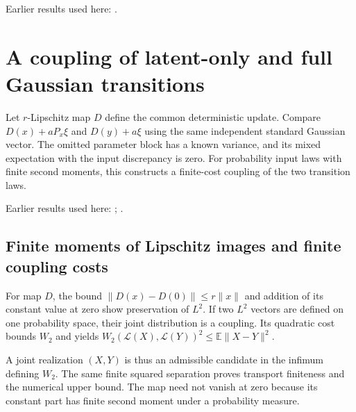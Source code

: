 \documentclass[11pt,a4paper]{report}
\begin{document}
Earlier results used here: \cite[Section~3.1.1]{LangevinLean2026IPLA}.
\section{\texorpdfstring{A coupling of latent-only and full Gaussian transitions}{A coupling of latent-only and full Gaussian transitions}}
\label{proof-module-ProximalLangevin-MYPGDTransport-lean}


Let \(r\)-Lipschitz map \(D\) define the common deterministic update. Compare \(D(x)+aP_x\xi\) and \(D(y)+a\xi\) using the same independent standard Gaussian vector. The omitted parameter block has a known variance, and its mixed expectation with the input discrepancy is zero. For probability input laws with finite second moments, this constructs a finite-cost coupling of the two transition laws.



Earlier results used here: \cite[Section~3.22]{LangevinLean2026ULASC}; \cite[Section~3.15]{LangevinLean2026ULASC}.
\subsection{\texorpdfstring{Finite moments of Lipschitz images and finite coupling costs}{Finite moments of Lipschitz images and finite coupling costs}}
\label{report-step-ProximalLangevin-MYPGDTransport-lean-1}


For map \(D\), the bound \(\|D(x)-D(0)\|\le r\|x\|\) and addition of its constant value at zero show preservation of \(L^2\). If two \(L^2\) vectors are defined on one probability space, their joint distribution is a coupling. Its quadratic cost bounds \(W_2\) and yields \(W_2(\mathcal L(X),\mathcal L(Y))^2\le\mathbb E\|X-Y\|^2\).



A joint realization \((X,Y)\) is thus an admissible candidate in the infimum defining \(W_2\). The same finite squared separation proves transport finiteness and the numerical upper bound. The map need not vanish at zero because its constant part has finite second moment under a probability measure.
\end{document}

